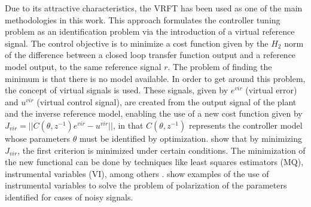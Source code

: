 	Due to its attractive characteristics, the VRFT has been used as one of the main methodologies in this work.
	This approach formulates the controller tuning problem as an identification problem via the introduction of a virtual reference signal.
	The control objective is to minimize a cost function given by the $H_2$ norm of the difference between a closed loop transfer function output and a reference model output, to the same reference signal $r$.
	The problem of finding the minimum is that there is no model available.
	In order to get around this problem, the concept of virtual signals is used.
	These signals, given by $e^{vir}$ (virtual error) and $u^{vir}$ (virtual control signal), are created from the output signal of the plant and the inverse reference model, enabling the use of a new cost function given by $J_{vir}=||C(\theta,z^{-1})e^{vir}-u^{vir}||$, in that $C(\theta,z^{-1})$ represents the controller model whose parameters $\theta$ must be identified by optimization.
	\cite{campi2002} show that by minimizing $J_{vir}$, the first criterion is minimized under certain conditions. The minimization of the new functional can be done by techniques like least squares estimators (MQ), instrumental variables (VI), among others \citep{aguirre2015}. \cite{bazanella2012} show examples of the use of instrumental variables to solve the problem of polarization of the parameters identified for cases of noisy signals.


